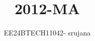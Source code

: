 \documentclass[journal]{IEEEtran}
\begin{document}

\vspace{3cm}

\title{2012-MA}
\author{EE24BTECH11042- srujana}
{\let\newpage\relax\maketitle}

\renewcommand{\thefigure}{\theenumi}
\renewcommand{\thetable}{\theenumi}
\setlength{\intextsep}{10pt} %


\renewcommand{\thetable}{\theenumi}
\end{document}
